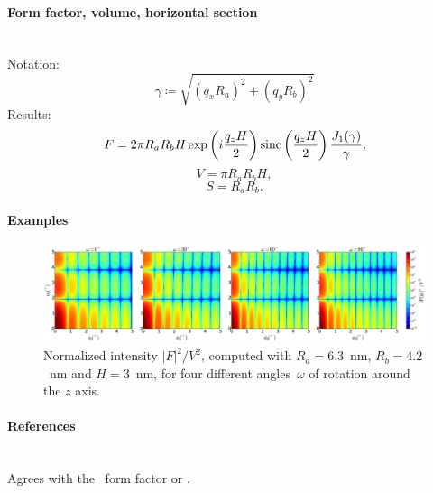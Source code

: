 \paragraph{Form factor, volume, horizontal section}\strut\\
Notation:
\begin{equation*}
  \gamma \coloneqq \sqrt{(q_x R_a)^2+(q_y R_b)^2}
\end{equation*}
Results:
\begin{equation*}
F = 2\pi R_a R_b H \exp\left(i\frac{q_z H}{2}\right)
   \operatorname{sinc}\left(\frac{q_z H}{2}\right) \frac{J_1(\gamma)}{\gamma},
\end{equation*}
\begin{equation*}
  V = \pi R_a R_bH,
\end{equation*}
\begin{equation*}
  S = R_a R_b.
\end{equation*}

\paragraph{Examples}\strut

\begin{figure}[H]
\begin{center}
\includegraphics[width=\textwidth]{fig/ff2/ff_EllipsoidalCylinder.pdf}
\end{center}
\caption{Normalized intensity $|F|^2/V^2$,
computed with $R_a=6.3$~nm, $R_b=4.2$~nm and $H=3$~nm,
for four different angles~$\omega$ of rotation around the $z$ axis.}
\end{figure}

\paragraph{References}\strut\\
Agrees with the \IsGISAXS\ form factor
 \cite[Eq.~2.41, wrongly labeled in Fig.~2.4]{Laz08}
or  \cite[Eq.~224]{ReLL09}.


 \label{SFullSphere}

